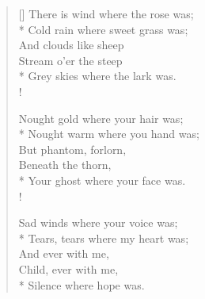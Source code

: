 \documentclass[MAIN]{subfiles}
\begin{document}
\settowidth{\versewidth}{There is wind where the rose was;}
\begin{verse}[\versewidth]
There is wind where the rose was;\\* 
Cold rain where sweet grass was;\\
\vin And clouds like sheep\\
\vin Stream o'er the steep\\*
Grey skies where the lark was.\\!

Nought gold where your hair was;\\*
Nought warm where you hand was;\\
\vin But phantom, forlorn,\\
\vin Beneath the thorn,\\*
Your ghost where your face was.\\!

Sad winds where your voice was;\\*
Tears, tears where my heart was;\\
\vin And ever with me,\\
\vin Child, ever with me,\\*
Silence where hope was.
\end{verse}
\end{document}
